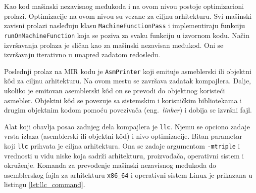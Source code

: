 \documentclass[12pt,oneside]{memoir}
\begin{document}

Kao kod mašinski nezavisnog međukoda i na ovom nivou postoje optimizacioni prolazi.
Optimizacije na ovom nivou su vezane za ciljnu arhitekturu.
Svi mašinski zavisni prolazi nasleđuju klasu \verb|MachineFunctionPass| i implementiraju funkciju \verb|runOnMachineFunction| koja se poziva za svaku funkciju u izvornom kodu.
Način izvršavanja prolaza je sličan kao za mašinski nezavisan međukod.
Oni se izvršavaju iterativno u unapred zadatom redosledu.

Poslednji prolaz na MIR kodu je \verb|AsmPrinter| koji emituje asmeblerski ili objektni k\^od za ciljnu arhitekturu.
Na ovom mestu se završava zadatak kompajlera.
Dalje, ukoliko je emitovan asemblerski k\^od on se prevodi do objektnog koristeći asmebler.
Objektni k\^od se povezuje sa sistemskim i korisničkim bibliotekama i drugim objektnim kodom pomoću povezivača (eng.~{\em linker}) i dobija se izvršni fajl.

Alat koji obavlja posao zadnjeg dela kompajlera je \verb|llc|.
Njemu se opciono zadaje vrsta izlaza (asemblerski ili objektni k\^od) i nivo optimizacije.
Bitan parametar koji \verb|llc| prihvata je ciljna arhitektura.
Ona se zadaje argumentom \verb|-mtriple| i vrednosti u vidu niske koja sadrži arhitekturu, proizvođača, operativni sistem i okruženje.
Komanda za prevođenje mašinski nezavisnog međukoda do asemblerskog fajla za arhitekturu \verb|x86_64| i operativni sistem Linux je prikazana u listingu \ref{lst:llc_command}.
\end{document}
